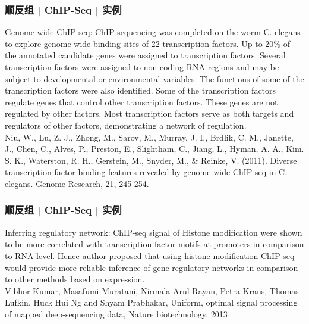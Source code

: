 \begin{frame}
  \frametitle{顺反组 | ChIP-Seq | 实例}
  Genome-wide ChIP-seq: ChIP-sequencing was completed on the worm C. elegans to explore genome-wide binding sites of 22 transcription factors. Up to 20\% of the annotated candidate genes were assigned to transcription factors. Several transcription factors were assigned to non-coding RNA regions and may be subject to developmental or environmental variables. The functions of some of the transcription factors were also identified. Some of the transcription factors regulate genes that control other transcription factors. These genes are not regulated by other factors. Most transcription factors serve as both targets and regulators of other factors, demonstrating a network of regulation.\\
  Niu, W., Lu, Z. J., Zhong, M., Sarov, M., Murray, J. I., Brdlik, C. M., Janette, J., Chen, C., Alves, P., Preston, E., Slightham, C., Jiang, L., Hyman, A. A., Kim. S. K., Waterston, R. H., Gerstein, M., Snyder, M., \& Reinke, V. (2011). Diverse transcription factor binding features revealed by genome-wide ChIP-seq in C. elegans. Genome Research, 21, 245-254.
\end{frame}

\begin{frame}
  \frametitle{顺反组 | ChIP-Seq | 实例}
  Inferring regulatory network: ChIP-seq signal of Histone modification were shown to be more correlated with transcription factor motifs at promoters in comparison to RNA level. Hence author proposed that using histone modification ChIP-seq would provide more reliable inference of gene-regulatory networks in comparison to other methods based on expression.\\
  Vibhor Kumar, Masafumi Muratani, Nirmala Arul Rayan, Petra Kraus, Thomas Lufkin, Huck Hui Ng and Shyam Prabhakar, Uniform, optimal signal processing of mapped deep-sequencing data, Nature biotechnology, 2013
\end{frame}

